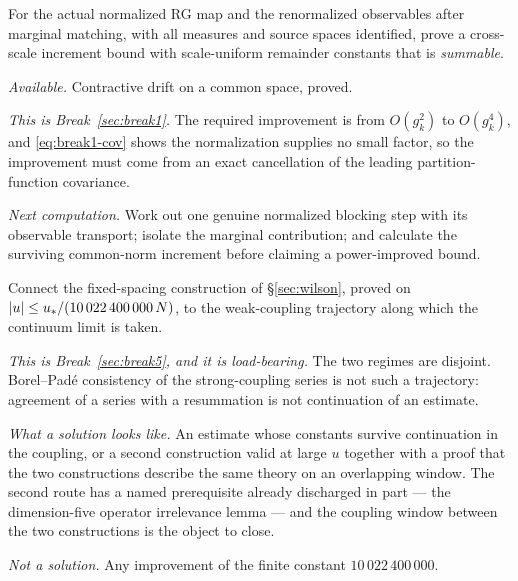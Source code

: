 \begin{problem}
\label{prob:cauchy}
For the actual normalized RG map and the renormalized observables after
marginal matching, with all measures and source spaces identified, prove
a cross-scale increment bound with scale-uniform remainder constants that
is \emph{summable}.

\emph{Available.} Contractive drift on a common space, proved.

\emph{This is Break~\ref{sec:break1}.} The required improvement is from
$O(g_k^2)$ to $O(g_k^4)$, and \eqref{eq:break1-cov} shows the
normalization supplies no small factor, so the improvement must come from
an exact cancellation of the leading partition-function covariance.

\emph{Next computation.} Work out one genuine normalized blocking step
with its observable transport; isolate the marginal contribution; and
calculate the surviving common-norm increment before claiming a
power-improved bound.
\end{problem}

\begin{problem}
\label{prob:trajectory}
Connect the fixed-spacing construction of \S\ref{sec:wilson}, proved on
$\left\lvert u \right\rvert \le u_*/(10\,022\,400\,000\,N)$, to the weak-coupling
trajectory along which the continuum limit is taken.

\emph{This is Break~\ref{sec:break5}, and it is load-bearing.} The two
regimes are disjoint. Borel--Pad\'e consistency of the strong-coupling
series is not such a trajectory: agreement of a series with a resummation
is not continuation of an estimate.

\emph{What a solution looks like.} An estimate whose constants survive
continuation in the coupling, or a second construction valid at large $u$
together with a proof that the two constructions describe the same
theory on an overlapping window. The second route has a named
prerequisite already discharged in part --- the dimension-five operator
irrelevance lemma --- and the coupling window between the two
constructions is the object to close.

\emph{Not a solution.} Any improvement of the finite constant
$10\,022\,400\,000$.
\end{problem}

